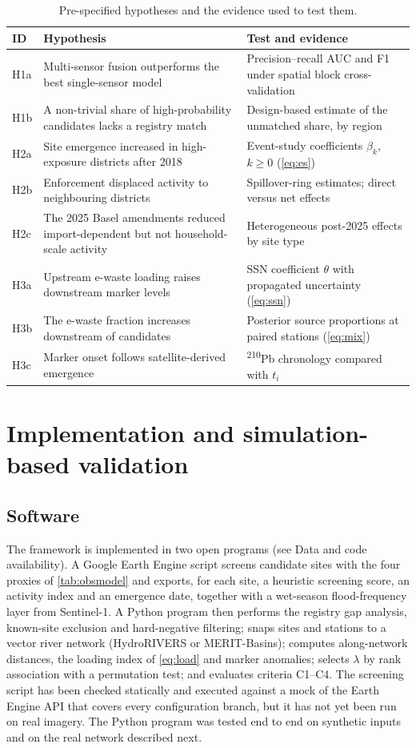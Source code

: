\documentclass[10pt]{article}
\begin{document}
\begin{table}[t]
\centering
\caption{Pre-specified hypotheses and the evidence used to test them.}
\label{tab:hypotheses}
\footnotesize
\begin{tabularx}{\textwidth}{@{}L{0.75cm}YL{5.7cm}@{}}
\toprule
ID & Hypothesis & Test and evidence\\
\midrule
H1a & Multi-sensor fusion outperforms the best single-sensor model & Precision--recall AUC and F1 under spatial block cross-validation\\
H1b & A non-trivial share of high-probability candidates lacks a registry match & Design-based estimate of the unmatched share, by region\\
H2a & Site emergence increased in high-exposure districts after 2018 & Event-study coefficients $\beta_k$, $k\ge0$ (\cref{eq:es})\\
H2b & Enforcement displaced activity to neighbouring districts & Spillover-ring estimates; direct versus net effects\\
H2c & The 2025 Basel amendments reduced import-dependent but not household-scale activity & Heterogeneous post-2025 effects by site type\\
H3a & Upstream e-waste loading raises downstream marker levels & SSN coefficient $\theta$ with propagated uncertainty (\cref{eq:ssn})\\
H3b & The e-waste fraction increases downstream of candidates & Posterior source proportions at paired stations (\cref{eq:mix})\\
H3c & Marker onset follows satellite-derived emergence & \textsuperscript{210}Pb chronology compared with $t_i$\\
\bottomrule
\end{tabularx}
\end{table}

\section{Implementation and simulation-based validation}\label{sec:validation}
\subsection{Software}
The framework is implemented in two open programs (see Data and code availability). A Google Earth Engine script screens candidate sites with the four proxies of \cref{tab:obsmodel} and exports, for each site, a heuristic screening score, an activity index and an emergence date, together with a wet-season flood-frequency layer from Sentinel-1. A Python program then performs the registry gap analysis, known-site exclusion and hard-negative filtering; snaps sites and stations to a vector river network (HydroRIVERS or MERIT-Basins); computes along-network distances, the loading index of \cref{eq:load} and marker anomalies; selects $\lambda$ by rank association with a permutation test; and evaluates criteria C1--C4. The screening script has been checked statically and executed against a mock of the Earth Engine API that covers every configuration branch, but it has not yet been run on real imagery. The Python program was tested end to end on synthetic inputs and on the real network described next.
\end{document}
